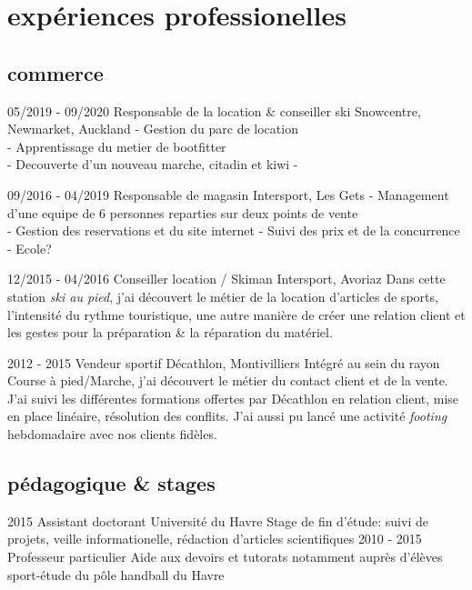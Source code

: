 \documentclass[]{farangoth-cv}
\begin{document}
\section{expériences professionelles}
\subsection{commerce}
\begin{entrylist}
  \entry%
  {05/2019 \-- 09/2020}
  {Responsable de la location \& conseiller ski}
  {Snowcentre, Newmarket, Auckland}
  {
    - Gestion du parc de location\\
    - Apprentissage du metier de bootfitter\\
    - Decouverte d'un nouveau marche, citadin et kiwi
    - 
  }
  
  \entry%
  {09/2016 \-- 04/2019}
  {Responsable de magasin}
  {Intersport, Les Gets}
  {
    - Management d'une equipe de 6 personnes reparties sur deux points de vente\\
    - Gestion des reservations  et du site internet
    - Suivi des prix et de la concurrence
    - Ecole?
  }
  
  \entry%
  {12/2015 \-- 04/2016}
  {Conseiller location / Skiman}
  {Intersport, Avoriaz}
  {
    Dans cette station \emph{ski au pied}, j'ai découvert le métier de la location d'articles de sports, l'intensité du rythme touristique, une autre manière de créer une relation client et les gestes pour la préparation \& la réparation du matériel.
  }
  
  \entry%
  {2012 \-- 2015}
  {Vendeur sportif}
  {Décathlon, Montivilliers}
  {%
    Intégré au sein du rayon Course à pied/Marche, j'ai découvert le métier du contact client et de la vente. J'ai suivi les différentes formations offertes par Décathlon en relation client, mise en place linéaire, résolution des conflits. J'ai aussi pu lancé une activité \emph{footing} hebdomadaire avec nos clients fidèles.
  }
\end{entrylist}

\subsection{pédagogique \& stages}
\begin{entrylist}
  \entry%
  {2015}
  {Assistant doctorant}
  {Université du Havre}
  {%
    Stage de fin d'étude: suivi de projets, veille informationelle, rédaction d'articles scientifiques
  }
  \entry%
  {2010 \-- 2015}
  {Professeur particulier}
  {}
  {%
    Aide aux devoirs et tutorats notamment auprès d'élèves sport-étude du pôle handball du Havre
  }

\end{entrylist}
\end{document}
